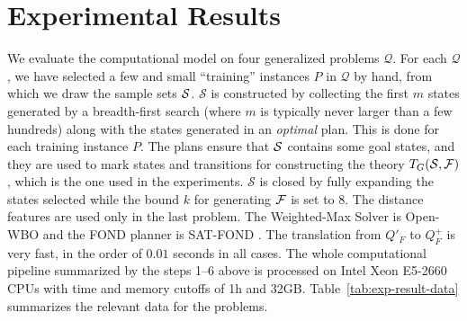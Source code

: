 \documentclass[letterpaper]{article} %
\newcommand{\Omit}[1]{}
\newcommand{\Q}{\mathcal{Q}}
\renewcommand{\S}{\mathcal{S}}
\begin{document}
\Omit{
Since we do not use a language for specifying $\Q$ formally, we will 
take the formulas $I_F$ and $G_F$  as a partial formal specification of
$\Q$. The theorem then says that if soundness over the samples, ensure
formal soundness over $\Q$, the policy that solves the FONDP problem $Q^+_F$,
solves $\Q$. The result holds whether $T$ or $T_G$ (goal marking) is used in step 3.
In principle, we could learn the formulas $I_F$ and $G_F$ from the sample as well,  but with different guarantees. 
}


\section{Experimental Results}

We evaluate the computational model on four generalized problems $\Q$. For each $\Q$, we have selected  a few and small  ``training''  instances $P$ in $\Q$ by hand, 
from which we draw  the sample sets $\cal S$.  $\S$ is constructed by collecting  the first $m$ states
generated by  a breadth-first search (where $m$ is typically never larger than a few hundreds)
along with  the states generated in an \emph{optimal} plan. This is done for each
training instance  $P$. The plans ensure that $\cal S$ contains some goal states, and they are used to mark states and transitions for
constructing  the theory $T_G({\cal S,\cal F})$, which is the one used in the experiments. $\S$ is closed by fully expanding the states selected
while the bound $k$ for generating  $\cal F$ is set to $8$. The  distance features are used only in the last problem.
The Weighted-Max Solver is Open-WBO \cite{martins2014open} and the FOND planner is SAT-FOND \cite{tomas:fond-sat}.
The translation from $Q'_F$ to $Q^+_F$ is very fast, in  the order of $0.01$ seconds in all cases.  
The whole computational pipeline summarized by the steps 1--6 above is processed on Intel Xeon E5-2660 CPUs
with time and memory cutoffs of 1h and 32GB. Table~\ref{tab:exp-result-data} summarizes the relevant data for 
the problems. 
\end{document}
